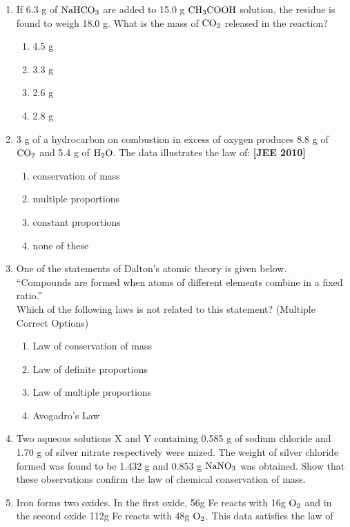\documentclass[
  14pt,
]{extarticle}
\providecommand{\tightlist}{%
  \setlength{\itemsep}{0pt}\setlength{\parskip}{0pt}}
\begin{document}
\begin{enumerate}
\def\labelenumi{\arabic{enumi}.}
\item
  If 6.3 g of \(\ce{NaHCO3}\) are added to 15.0 g \(\ce{CH3COOH}\)
  solution, the residue is found to weigh 18.0 g. What is the mass of
  \(\ce{CO2}\) released in the reaction?

  \begin{enumerate}
  \def\labelenumii{(\Alph{enumii})}
  \tightlist
  \item
    4.5 g
  \item
    3.3 g
  \item
    2.6 g
  \item
    2.8 g
  \end{enumerate}
\item
  3 g of a hydrocarbon on combustion in excess of oxygen produces 8.8 g
  of \(\ce{CO2}\) and 5.4 g of \(\ce{H2O}\). The data illustrates the
  law of: \textbf{{[}JEE 2010{]}}

  \begin{enumerate}
  \def\labelenumii{(\Alph{enumii})}
  \tightlist
  \item
    conservation of mass
  \item
    multiple proportions
  \item
    constant proportions
  \item
    none of these
  \end{enumerate}
\item
  One of the statements of Dalton's atomic theory is given below.\\
  ``Compounds are formed when atoms of different elements combine in a
  fixed ratio.''\\
  Which of the following laws is not related to this statement?
  (Multiple Correct Options)

  \begin{enumerate}
  \def\labelenumii{(\Alph{enumii})}
  \tightlist
  \item
    Law of conservation of mass
  \item
    Law of definite proportions
  \item
    Law of multiple proportions
  \item
    Avogadro's Law
  \end{enumerate}
\item
  Two aqueous solutions X and Y containing 0.585 g of sodium chloride
  and 1.70 g of silver nitrate respectively were mized. The weight of
  silver chloride formed was found to be 1.432 g and 0.853 g
  \(\ce{NaNO3}\) was obtained. Show that these observations confirm the
  law of chemical conservation of mass.
\item
  Iron forms two oxides. In the first oxide, 56g Fe reacts with 16g
  \(\ce{O2}\) and in the second oxide 112g Fe reacts with 48g
  \(\ce{O2}\). This data satisfies the law of


\end{enumerate}
\end{document}
